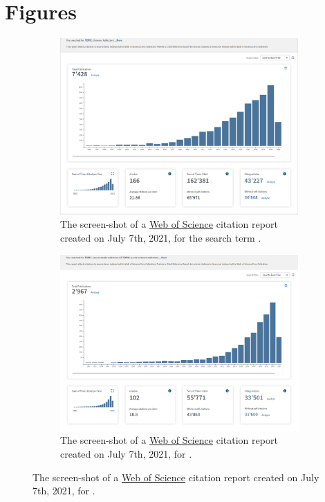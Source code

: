 \section{Figures}
\label{app:figures}
\begin{figure}
\centering
    \begin{subfigure}[b]{0.83\textwidth}
        \centering
        \includegraphics[width = \textwidth]{figures/Internet_addiction.png}
        \caption{The screen-shot of a \href{https://apps.webofknowledge.com/}{Web of Science} citation report created on July 7th, 2021, for the search term .}
        \label{fig:internet_addiction}
    \end{subfigure}
    \begin{subfigure}[b]{0.83\textwidth}
        \centering
    \includegraphics[width = \textwidth]{figures/Social_media_addiction.png}
    \caption{The screen-shot of a \href{https://apps.webofknowledge.com/}{Web of Science} citation report created on July 7th, 2021, for .}
    \label{fig:sns_addiction}
    \end{subfigure}
\end{figure}

